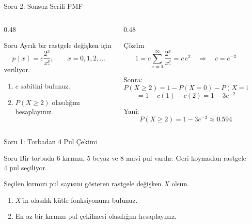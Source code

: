\documentclass[light]{lutbeamer}
\begin{document}
\begin{frame}{Soru 2: Sonsuz Serili PMF}
\scriptsize
\begin{columns}[T,onlytextwidth]
    \begin{column}{0.48\textwidth}
        \begin{block}{Soru}
            Ayrık bir rastgele değişken için
            \[
            p(x)=c\frac{2^x}{x!}, \qquad x=0,1,2,\ldots
            \]
            veriliyor.

            \vspace{0.15cm}
            \begin{enumerate}
                \item $c$ sabitini bulunuz.
                \item $P(X \ge 2)$ olasılığını hesaplayınız.
            \end{enumerate}
        \end{block}
    \end{column}
    \begin{column}{0.48\textwidth}
        \begin{exampleblock}{Çözüm}
            \[
            1=c\sum_{x=0}^{\infty}\frac{2^x}{x!}=c\,e^2
            \quad \Rightarrow \quad
            c=e^{-2}
            \]

            Sonra:
            \[
            P(X \ge 2)=1-P(X=0)-P(X=1)
            \]
            \[
            =1-c(1)-c(2)=1-3e^{-2}
            \]

            Yani:
            \[
            P(X \ge 2)=1-3e^{-2}\approx 0.594
            \]
        \end{exampleblock}
    \end{column}
\end{columns}
\end{frame}

\begin{frame}{Soru 1: Torbadan 4 Pul Çekimi}
\scriptsize
\begin{block}{Soru}
    Bir torbada 6 kırmızı, 5 beyaz ve 8 mavi pul vardır. Geri koymadan rastgele 4 pul seçiliyor.

    \vspace{0.15cm}
    Seçilen kırmızı pul sayısını gösteren rastgele değişken $X$ olsun.

    \vspace{0.15cm}
    \begin{enumerate}
        \item $X$'in olasılık kütle fonksiyonunu bulunuz.
        \item En az bir kırmızı pul çekilmesi olasılığını hesaplayınız.
    \end{enumerate}
\end{block}
\end{frame}
\end{document}
